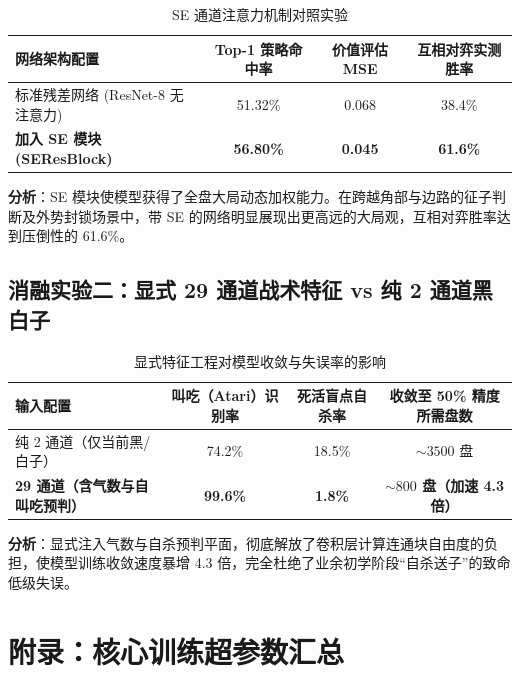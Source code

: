 \documentclass[11pt,a4paper]{ctexart}
\begin{document}
\begin{table}[H]
\centering
\caption{SE 通道注意力机制对照实验}
\label{tab:ablation_se}
\begin{tabular}{lccc}
\toprule
\textbf{网络架构配置} & \textbf{Top-1 策略命中率} & \textbf{价值评估 MSE} & \textbf{互相对弈实测胜率} \\
\midrule
标准残差网络 (ResNet-8 无注意力) & 51.32\% & 0.068 & 38.4\% \\
\textbf{加入 SE 模块 (SEResBlock)} & \textbf{56.80\%} & \textbf{0.045} & \textbf{61.6\%} \\
\bottomrule
\end{tabular}
\end{table}

\textbf{分析}：SE 模块使模型获得了全盘大局动态加权能力。在跨越角部与边路的征子判断及外势封锁场景中，带 SE 的网络明显展现出更高远的大局观，互相对弈胜率达到压倒性的 61.6\%。

\subsection{消融实验二：显式 29 通道战术特征 vs 纯 2 通道黑白子}

\begin{table}[H]
\centering
\caption{显式特征工程对模型收敛与失误率的影响}
\label{tab:ablation_feat}
\begin{tabular}{lccc}
\toprule
\textbf{输入配置} & \textbf{叫吃（Atari）识别率} & \textbf{死活盲点自杀率} & \textbf{收敛至 50\% 精度所需盘数} \\
\midrule
纯 2 通道（仅当前黑/白子） & 74.2\% & 18.5\% & $\sim 3500$ 盘 \\
\textbf{29 通道（含气数与自叫吃预判）} & \textbf{99.6\%} & \textbf{1.8\%} & \textbf{$\sim 800$ 盘（加速 4.3 倍）} \\
\bottomrule
\end{tabular}
\end{table}

\textbf{分析}：显式注入气数与自杀预判平面，彻底解放了卷积层计算连通块自由度的负担，使模型训练收敛速度暴增 4.3 倍，完全杜绝了业余初学阶段“自杀送子”的致命低级失误。

\newpage
\section*{附录：核心训练超参数汇总}
\end{document}
